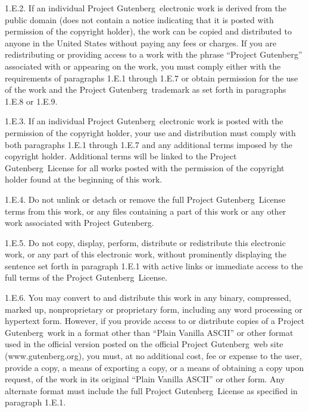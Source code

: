 1.E.2.  If an individual Project
Gutenberg\texttrademark\ electronic work is derived
from the public domain (does not contain a notice indicating that it
is posted with permission of the copyright holder), the work can be
copied and distributed to anyone in the United States without paying
any fees or charges.  If you are redistributing or providing access to
a work with the phrase ``Project Gutenberg'' associated with or
appearing on the work, you must comply either with the requirements of
paragraphs 1.E.1 through 1.E.7 or obtain permission for the use of the
work and the Project Gutenberg\texttrademark\
trademark as set forth in paragraphs 1.E.8 or 1.E.9.

1.E.3.  If an individual Project
Gutenberg\texttrademark\ electronic work is posted
with the permission of the copyright holder, your use and distribution
must comply with both paragraphs 1.E.1 through 1.E.7 and any
additional terms imposed by the copyright holder.  Additional terms
will be linked to the Project
Gutenberg\texttrademark\ License for all works posted
with the permission of the copyright holder found at the beginning of
this work.

1.E.4.  Do not unlink or detach or remove the full Project
Gutenberg\texttrademark\ License terms from this
work, or any files containing a part of this work or any other work
associated with Project Gutenberg\texttrademark.

1.E.5.  Do not copy, display, perform, distribute or redistribute this
electronic work, or any part of this electronic work, without
prominently displaying the sentence set forth in paragraph 1.E.1 with
active links or immediate access to the full terms of the Project
Gutenberg\texttrademark\ License.

1.E.6.  You may convert to and distribute this work in any binary,
compressed, marked up, nonproprietary or proprietary form, including
any word processing or hypertext form.  However, if you provide access
to or distribute copies of a Project
Gutenberg\texttrademark\ work in a format other than
``Plain Vanilla ASCII'' or other format used in the official version
posted on the official Project
Gutenberg\texttrademark\ web site
(www.gutenberg.org), you must, at no additional cost, fee or expense
to the user, provide a copy, a means of exporting a copy, or a means
of obtaining a copy upon request, of the work in its original ``Plain
Vanilla ASCII'' or other form.  Any alternate format must include the
full Project Gutenberg\texttrademark\ License as
specified in paragraph 1.E.1.

